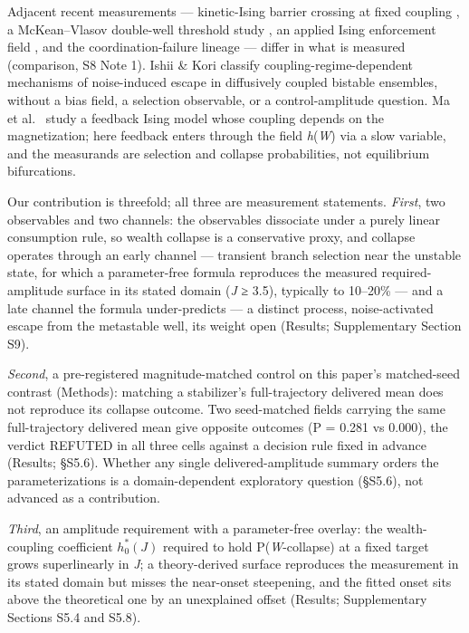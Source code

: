 \documentclass[11pt,letterpaper]{article}
\begin{document}
Adjacent recent measurements --- kinetic-Ising barrier crossing at fixed coupling \cite{oliverbonafoux2026}, a McKean--Vlasov double-well threshold study \cite{abreufilho2025}, an applied Ising enforcement field \cite{zaklan2009}, and the coordination-failure lineage \cite{diamond1982,cooperjohn1988} --- differ in what is measured (comparison, S8 Note 1). Ishii \& Kori \cite{ishiikori2025} classify coupling-regime-dependent mechanisms of noise-induced escape in diffusively coupled bistable ensembles, without a bias field, a selection observable, or a control-amplitude question. Ma et al.~\cite{ma2025feedback} study a feedback Ising model whose coupling depends on the magnetization; here feedback enters through the field \emph{h}(\emph{W}) via a slow variable, and the measurands are selection and collapse probabilities, not equilibrium bifurcations.

Our contribution is threefold; all three are measurement statements. \emph{First}, two observables and two channels: the observables dissociate under a purely linear consumption rule, so wealth collapse is a conservative proxy, and collapse operates through an early channel --- transient branch selection near the unstable state, for which a parameter-free formula reproduces the measured required-amplitude surface in its stated domain (\emph{J} ≥ 3.5), typically to 10--20\% --- and a late channel the formula under-predicts --- a distinct process, noise-activated escape from the metastable well, its weight open (Results; Supplementary Section S9).

\emph{Second}, a pre-registered magnitude-matched control on this paper's matched-seed contrast (Methods): matching a stabilizer's full-trajectory delivered mean does not reproduce its collapse outcome. Two seed-matched fields carrying the same full-trajectory delivered mean give opposite outcomes (P = 0.281 vs 0.000), the verdict REFUTED in all three cells against a decision rule fixed in advance (Results; §S5.6). Whether any single delivered-amplitude summary orders the parameterizations is a domain-dependent exploratory question (§S5.6), not advanced as a contribution.

\emph{Third}, an amplitude requirement with a parameter-free overlay: the wealth-coupling coefficient \(h_0^*(J)\) required to hold P(\emph{W}-collapse) at a fixed target grows superlinearly in \emph{J}; a theory-derived surface reproduces the measurement in its stated domain but misses the near-onset steepening, and the fitted onset sits above the theoretical one by an unexplained offset (Results; Supplementary Sections S5.4 and S5.8).
\end{document}

